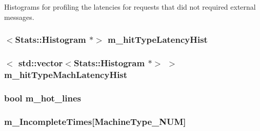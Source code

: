 \label{classProfiler_add8e2c73ddfe42f1b177e641a0e626d5}
Histograms for profiling the latencies for requests that did not required external messages. \hypertarget{classProfiler_aeecaf5411cd3b34435f621db03387b67}{
\subsubsection[{m\_\-hitTypeLatencyHist}]{$<${\bf Stats::Histogram} $\ast$$>$ {\bf m\_\-hitTypeLatencyHist}}}
\label{classProfiler_aeecaf5411cd3b34435f621db03387b67}
\hypertarget{classProfiler_aaf855f02483dc21743651007a759ea77}{
\subsubsection[{m\_\-hitTypeMachLatencyHist}]{$<$ {\bf std::vector}$<${\bf Stats::Histogram} $\ast$$>$ $>$ {\bf m\_\-hitTypeMachLatencyHist}}}
\label{classProfiler_aaf855f02483dc21743651007a759ea77}
\hypertarget{classProfiler_a3b63dfc643f2cf98e6d5deff9fce467e}{
\subsubsection[{m\_\-hot\_\-lines}]{\setlength{\rightskip}{0pt plus 5cm}bool {\bf m\_\-hot\_\-lines}}}
\label{classProfiler_a3b63dfc643f2cf98e6d5deff9fce467e}
\hypertarget{classProfiler_a4646ee2cafcbe46b66af5d8253eac92f}{
\subsubsection[{m\_\-IncompleteTimes}]{ {\bf m\_\-IncompleteTimes}\mbox{[}MachineType\_\-NUM\mbox{]}}}
